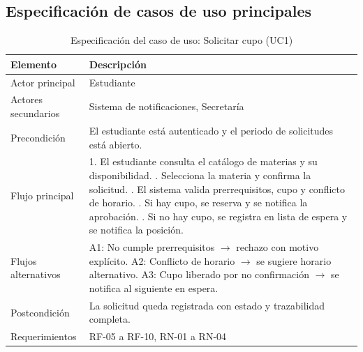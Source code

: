 \subsection{Especificación de casos de uso principales}

\begin{table}[H]
\centering
\caption{Especificación del caso de uso: Solicitar cupo (UC1)}
\label{tab:uc1}
\small
\begin{tabularx}{\textwidth}{@{}l X@{}}
\toprule
\rowcolor{azulClaro}
\textbf{Elemento} & \textbf{Descripción} \\
\midrule
Actor principal & Estudiante \\
Actores secundarios & Sistema de notificaciones, Secretaría \\
Precondición & El estudiante está autenticado y el periodo de solicitudes está abierto. \\
Flujo principal &
  1. El estudiante consulta el catálogo de materias y su disponibilidad. \newline
  2. Selecciona la materia y confirma la solicitud. \newline
  3. El sistema valida prerrequisitos, cupo y conflicto de horario. \newline
  4. Si hay cupo, se reserva y se notifica la aprobación. \newline
  5. Si no hay cupo, se registra en lista de espera y se notifica la posición. \\
Flujos alternativos &
  A1: No cumple prerrequisitos $\to$ rechazo con motivo explícito. \newline
  A2: Conflicto de horario $\to$ se sugiere horario alternativo. \newline
  A3: Cupo liberado por no confirmación $\to$ se notifica al siguiente en espera. \\
Postcondición & La solicitud queda registrada con estado y trazabilidad completa. \\
Requerimientos & RF-05 a RF-10, RN-01 a RN-04 \\
\bottomrule
\end{tabularx}
\end{table}

